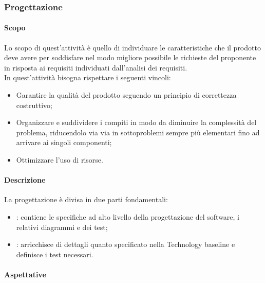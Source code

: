 \subsubsection{Progettazione}
\label{ssub:progettazione}
 
\paragraph{Scopo}
\label{par:progettazione:scopo}

Lo scopo di quest'attività è quello di individuare le caratteristiche che il prodotto deve avere per soddisfare nel 
modo migliore possibile le richieste del proponente in risposta ai requisiti individuati dall'analisi dei requisiti. \\
In quest'attività bisogna rispettare i seguenti vincoli:
\begin{itemize}
    \item Garantire la qualità del prodotto seguendo un principio di correttezza costruttivo;
    \item Organizzare e suddividere i compiti in modo da diminuire la complessità del problema, riducendolo via via in 
    sottoproblemi sempre più elementari fino ad arrivare ai singoli componenti;
    \item Ottimizzare l'uso di risorse.
\end{itemize}

\paragraph{Descrizione}
La progettazione è divisa in due parti fondamentali:
\begin{itemize}
    \item {}: contiene le specifiche ad alto livello della progettazione del software, 
    i relativi diagrammi  e dei test;
    \item {}: arricchisce di dettagli quanto specificato nella Technology baseline e 
    definisce i test necessari.
\end{itemize}

\paragraph{Aspettative}

